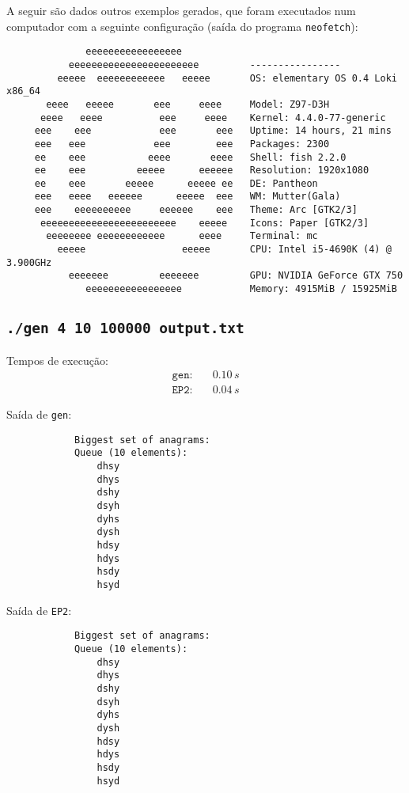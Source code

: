 \documentclass[a4paper]{article}
\newcommand{\ttt}{\texttt}
\begin{document}
    A seguir são dados outros exemplos gerados, que foram executados num computador com a seguinte configuração (saída do programa \ttt{neofetch}):
    \begin{lstlisting}
              eeeeeeeeeeeeeeeee            
           eeeeeeeeeeeeeeeeeeeeeee         ----------------
         eeeee  eeeeeeeeeeee   eeeee       OS: elementary OS 0.4 Loki x86_64
       eeee   eeeee       eee     eeee     Model: Z97-D3H
      eeee   eeee          eee     eeee    Kernel: 4.4.0-77-generic
     eee    eee            eee       eee   Uptime: 14 hours, 21 mins
     eee   eee            eee        eee   Packages: 2300
     ee    eee           eeee       eeee   Shell: fish 2.2.0
     ee    eee         eeeee      eeeeee   Resolution: 1920x1080
     ee    eee       eeeee      eeeee ee   DE: Pantheon
     eee   eeee   eeeeee      eeeee  eee   WM: Mutter(Gala)
     eee    eeeeeeeeee     eeeeee    eee   Theme: Arc [GTK2/3]
      eeeeeeeeeeeeeeeeeeeeeeee    eeeee    Icons: Paper [GTK2/3]
       eeeeeeee eeeeeeeeeeee      eeee     Terminal: mc
         eeeee                 eeeee       CPU: Intel i5-4690K (4) @ 3.900GHz
           eeeeeee         eeeeeee         GPU: NVIDIA GeForce GTX 750
              eeeeeeeeeeeeeeeee            Memory: 4915MiB / 15925MiB
    \end{lstlisting}

    \newpage
    \subsection{\tt ./gen 4 10 100000 output.txt}
        Tempos de execução:
        \begin{align*}
            \ttt{gen:}\quad &0.10\, s\\
            \ttt{EP2:}\quad &0.04\, s
        \end{align*}

        Saída de \ttt{gen}:
        \begin{lstlisting}
            Biggest set of anagrams:
            Queue (10 elements):
                dhsy
                dhys
                dshy
                dsyh
                dyhs
                dysh
                hdsy
                hdys
                hsdy
                hsyd
        \end{lstlisting}

        Saída de \ttt{EP2}:
        \begin{lstlisting}
            Biggest set of anagrams:
            Queue (10 elements):
                dhsy
                dhys
                dshy
                dsyh
                dyhs
                dysh
                hdsy
                hdys
                hsdy
                hsyd
        \end{lstlisting}
\end{document}
